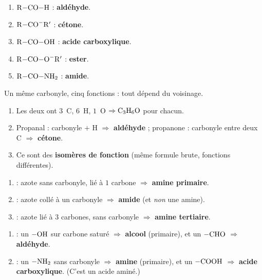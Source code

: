 \documentclass[11pt,a4paper]{article}
\begin{document}
\begin{corrige}
\begin{enumerate}[label=\alph*)]
  \item $\ce{R-CO-H}$ : \textbf{aldéhyde}.
  \item $\ce{R-CO-}\mathrm{R}'$ : \textbf{cétone}.
  \item $\ce{R-CO-OH}$ : \textbf{acide carboxylique}.
  \item $\ce{R-CO-O-}\mathrm{R}'$ : \textbf{ester}.
  \item $\ce{R-CO-NH2}$ : \textbf{amide}.
\end{enumerate}
Un même carbonyle, cinq fonctions : tout dépend du voisinage.
\end{corrige}

\begin{corrige}
\begin{enumerate}[label=\alph*)]
  \item Les deux ont $3$~C, $6$~H, $1$~O $\Rightarrow \ce{C3H6O}$ pour chacun.
  \item Propanal : carbonyle $+$ H $\Rightarrow$ \textbf{aldéhyde} ; propanone : carbonyle entre deux C $\Rightarrow$ \textbf{cétone}.
  \item Ce sont des \textbf{isomères de fonction} (même formule brute, fonctions différentes).
\end{enumerate}
\end{corrige}

\begin{corrige}
\begin{enumerate}[label=\alph*)]
  \item {} : azote sans carbonyle, lié à $1$ carbone $\Rightarrow$ \textbf{amine primaire}.
  \item {} : azote collé à un carbonyle $\Rightarrow$ \textbf{amide} (et \emph{non} une amine).
  \item {} : azote lié à $3$ carbones, sans carbonyle $\Rightarrow$ \textbf{amine tertiaire}.
\end{enumerate}
\end{corrige}

\begin{corrige}
\begin{enumerate}[label=\alph*)]
  \item {} : un $-\ce{OH}$ sur carbone saturé $\Rightarrow$ \textbf{alcool} (primaire), et un $-\ce{CHO}$ $\Rightarrow$ \textbf{aldéhyde}.
  \item {} : un $-\ce{NH2}$ sans carbonyle $\Rightarrow$ \textbf{amine} (primaire), et un $-\ce{COOH}$ $\Rightarrow$ \textbf{acide carboxylique}. (C'est un acide aminé.)
\end{enumerate}
\end{corrige}
\end{document}
